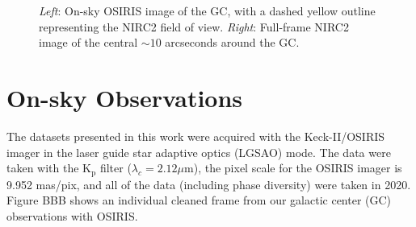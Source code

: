 \documentclass[]{spie}  %
\begin{document}
\begin{figure}[!h]
  \caption{\footnotesize \textit{Left}: On-sky OSIRIS image of the GC, with a dashed yellow outline representing the NIRC2 field of view. \textit{Right}: Full-frame NIRC2 image of the central ${\sim}10$ arcseconds around the GC.} \label{fig:gc_osiris_nirc2}
\end{figure}

\section{On-sky Observations}\label{sec:on-sky-obs}
The datasets presented in this work were acquired with the Keck-II/OSIRIS imager in the laser guide star adaptive optics (LGSAO) mode. The data were taken with the K$_{\textrm{p}}$ filter ($\lambda_{c} = 2.12\mu$m), the pixel scale for the OSIRIS imager is 9.952 mas/pix, and all of the data (including phase diversity) were taken in 2020. Figure BBB shows an individual cleaned frame from our galactic center (GC) observations with OSIRIS.
\end{document}
